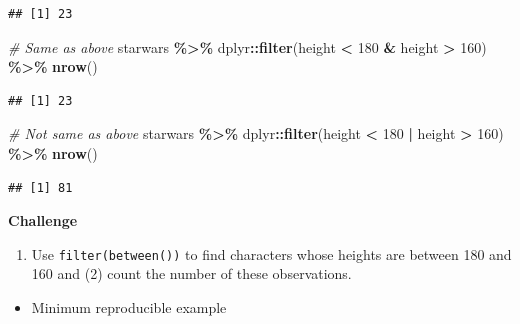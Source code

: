 \documentclass[
]{book}
\newenvironment{Shaded}{\begin{snugshade}}{\end{snugshade}}
\newcommand{\CommentTok}[1]{\textcolor[rgb]{0.56,0.35,0.01}{\textit{#1}}}
\newcommand{\DecValTok}[1]{\textcolor[rgb]{0.00,0.00,0.81}{#1}}
\newcommand{\FunctionTok}[1]{\textcolor[rgb]{0.13,0.29,0.53}{\textbf{#1}}}
\newcommand{\NormalTok}[1]{#1}
\newcommand{\SpecialCharTok}[1]{\textcolor[rgb]{0.81,0.36,0.00}{\textbf{#1}}}
\providecommand{\tightlist}{%
  \setlength{\itemsep}{0pt}\setlength{\parskip}{0pt}}
\begin{document}
\begin{verbatim}
## [1] 23
\end{verbatim}

\begin{Shaded}
\begin{Highlighting}[]
\CommentTok{\# Same as above}
\NormalTok{starwars }\SpecialCharTok{\%\textgreater{}\%}
\NormalTok{  dplyr}\SpecialCharTok{::}\FunctionTok{filter}\NormalTok{(height }\SpecialCharTok{\textless{}} \DecValTok{180} \SpecialCharTok{\&}\NormalTok{ height }\SpecialCharTok{\textgreater{}} \DecValTok{160}\NormalTok{) }\SpecialCharTok{\%\textgreater{}\%}
  \FunctionTok{nrow}\NormalTok{()}
\end{Highlighting}
\end{Shaded}

\begin{verbatim}
## [1] 23
\end{verbatim}

\begin{Shaded}
\begin{Highlighting}[]
\CommentTok{\# Not same as above}
\NormalTok{starwars }\SpecialCharTok{\%\textgreater{}\%}
\NormalTok{  dplyr}\SpecialCharTok{::}\FunctionTok{filter}\NormalTok{(height }\SpecialCharTok{\textless{}} \DecValTok{180} \SpecialCharTok{|}\NormalTok{ height }\SpecialCharTok{\textgreater{}} \DecValTok{160}\NormalTok{) }\SpecialCharTok{\%\textgreater{}\%}
  \FunctionTok{nrow}\NormalTok{()}
\end{Highlighting}
\end{Shaded}

\begin{verbatim}
## [1] 81
\end{verbatim}

\textbf{Challenge}

\begin{enumerate}
\def\labelenumi{(\arabic{enumi})}
\tightlist
\item
  Use \texttt{filter(between())} to find characters whose heights are between 180 and 160 and (2) count the number of these observations.
\end{enumerate}

\begin{itemize}
\tightlist
\item
  Minimum reproducible example
\end{itemize}
\end{document}
